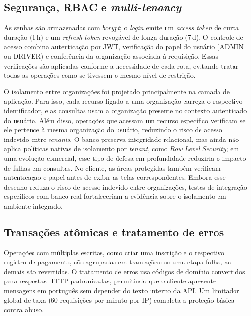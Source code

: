 \documentclass[a4paper,12pt]{article}
\begin{document}
\subsection{Segurança, RBAC e \textit{multi-tenancy}}
\label{sec:seguranca}

As senhas são armazenadas com \textit{bcrypt}; o \textit{login} emite um \textit{access token} de curta duração (1\,h) e um \textit{refresh token} revogável de longa duração (7\,d). O controle de acesso combina autenticação por JWT, verificação do papel do usuário (ADMIN ou DRIVER) e conferência da organização associada à requisição. Essas verificações são aplicadas conforme a necessidade de cada rota, evitando tratar todas as operações como se tivessem o mesmo nível de restrição.

O isolamento entre organizações foi projetado principalmente na camada de aplicação. Para isso, cada recurso ligado a uma organização carrega o respectivo identificador, e as consultas usam a organização presente no contexto autenticado do usuário. Além disso, operações que acessam um recurso específico verificam se ele pertence à mesma organização do usuário, reduzindo o risco de acesso indevido entre \textit{tenants}. O banco preserva integridade relacional, mas ainda não aplica políticas nativas de isolamento por \textit{tenant}, como \textit{Row Level Security}; em uma evolução comercial, esse tipo de defesa em profundidade reduziria o impacto de falhas em consultas. No cliente, as áreas protegidas também verificam autenticação e papel antes de exibir as telas correspondentes. Embora esse desenho reduza o risco de acesso indevido entre organizações, testes de integração específicos com banco real fortaleceriam a evidência sobre o isolamento em ambiente integrado.

\subsection{Transações atômicas e tratamento de erros}
\label{sec:transacoes}

Operações com múltiplas escritas, como criar uma inscrição e o respectivo registro de pagamento, são agrupadas em transações: se uma etapa falha, as demais são revertidas. O tratamento de erros usa códigos de domínio convertidos para respostas HTTP padronizadas, permitindo que o cliente apresente mensagens em português sem depender do texto interno da API. Um limitador global de taxa (60 requisições por minuto por IP) completa a proteção básica contra abuso.
\end{document}
